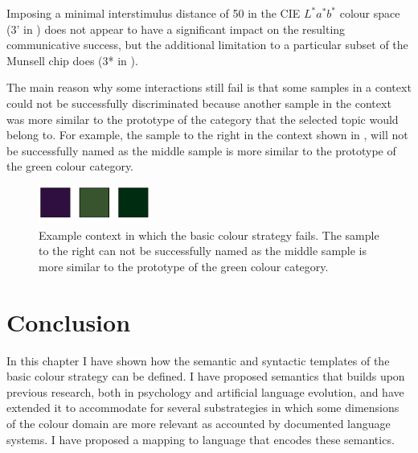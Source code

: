 Imposing a minimal interstimulus distance of 50 in the CIE $L^*a^*b^*$
colour space (3' in ) does not
appear to have a significant impact on the resulting communicative
success, but the additional limitation to a particular subset of the
Munsell chip does (3* in ).

The main reason why some interactions still fail is that some samples
in a context could not be successfully discriminated because another
sample in the context was more similar to the prototype of the
category that the selected topic would belong to. For example, the
sample to the right in the context shown in , will not be successfully named as
the middle sample is more similar to the prototype of the green colour
category.

\begin{figure}
  \begin{center}
    \includegraphics[height=1.25cm]{./basic-strategy/figures/baseline-failure-context.pdf}
    \caption[Example context in which the basic colour strategy
    fails]{Example context in which the basic colour strategy
      fails. The sample to the right can not be successfully named as
      the middle sample is more similar to the prototype of the green
      colour category.}
    \label{f:bcs-failure-context}
  \end{center}
\end{figure}

\section{Conclusion}

In this chapter I have shown how the semantic and syntactic templates
of the basic colour strategy can be defined. I have proposed
semantics that builds upon previous research, both in psychology and
artificial language evolution, and have extended it to accommodate for
several substrategies in which some dimensions of the colour domain
are more relevant as accounted by documented language systems. I have
proposed a mapping to language that encodes these semantics.
